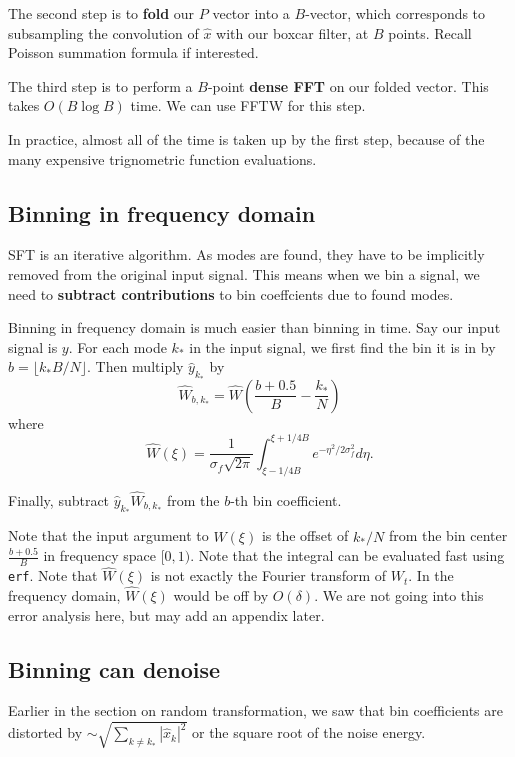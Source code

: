 \documentclass[10pt]{article}
\begin{document}
The second step is to \textbf{fold} our $P$ vector into a $B$-vector, which corresponds to subsampling the convolution of $\hat{x}$ with our boxcar filter, at $B$ points. Recall Poisson summation formula if interested.

The third step is to perform a $B$-point \textbf{dense FFT} on our folded vector. This takes $O(B\log B)$ time. We can use FFTW for this step.

In practice, almost all of the time is taken up by the first step, because of the many expensive trignometric function evaluations.

\subsection{Binning in frequency domain}

SFT is an iterative algorithm. As modes are found, they have to be implicitly removed from the original input signal. This means when we bin a signal, we need to \textbf{subtract contributions} to bin coeffcients due to found modes.

Binning in frequency domain is much easier than binning in time. Say our input signal is $y$. For each mode $k_*$ in the input signal, we first find the bin it is in by $b = \lfloor k_* B/N \rfloor$. Then multiply $\hat{y}_{k_*}$ by
$$\hat{W}_{b,k_*} = \hat{W}\left(\frac{b+0.5}{B}-\frac{k_*}{N}\right)$$
where
$$\hat{W}(\xi)=\frac{1}{\sigma_f \sqrt{2\pi}} \int_{\xi-1/4B}^{\xi+1/4B} e^{-\eta^2/2\sigma_f^2} d\eta.$$

Finally, subtract $\hat{y}_{k_*} \hat{W}_{b,k_*}$ from the $b$-th bin coefficient.

Note that the input argument to $\hat{W}(\xi)$ is the offset of $k_*/N$ from the bin center $\frac{b+0.5}{B}$ in frequency space $[0,1)$.  Note that the integral can be evaluated fast using \texttt{erf}. Note that $\hat{W}(\xi)$ is not exactly the Fourier transform of $W_t$. In the frequency domain, $\hat{W}(\xi)$ would be off by $O(\delta)$. We are not going into this error analysis here, but may add an appendix later.

\subsection{Binning can denoise}

Earlier in the section on random transformation, we saw that bin coefficients are distorted by $\sim \sqrt{\sum_{k\neq k_*} |\hat{x}_k|^2}$ or the square root of the noise energy.
\end{document}
